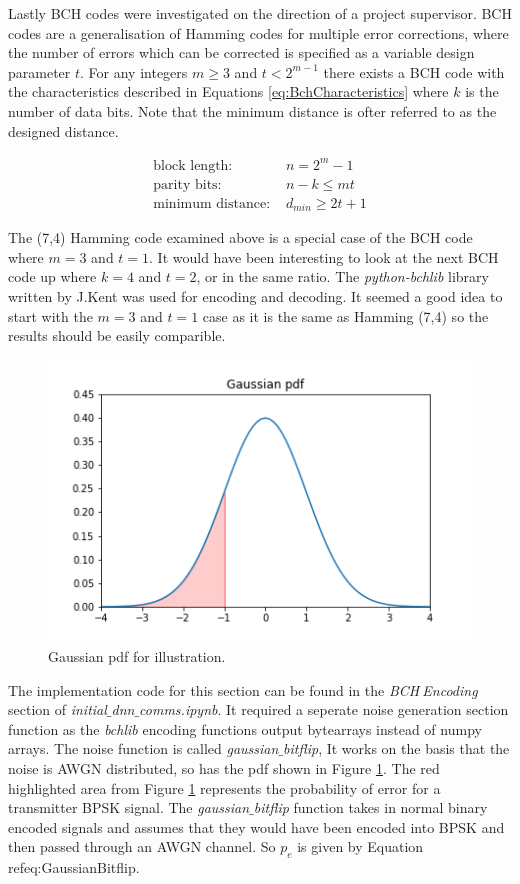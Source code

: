 \documentclass[12pt,onecolumn,letterpaper]{article}
\newcommand{\code}{\textit}
\newcommand\genfigsize{0.5}
\begin{document}
Lastly BCH codes were investigated on the direction of a project supervisor. BCH codes are a generalisation of Hamming codes for multiple error corrections, where the number of errors which can be corrected is specified as a variable design parameter $t$. For any integers $m \geq 3$ and $t < 2^{m-1}$ there exists a BCH code with the characteristics described in Equations \ref{eq:BchCharacteristics} where $k$ is the number of data bits. Note that the minimum distance is ofter referred to as the designed distance.

\begin{align}
   \mbox{block length: }& n = 2^{m}-1 \nonumber\\
   \mbox{parity bits: }& n-k\leq mt \nonumber\\
   \mbox{minimum distance: }& d_{min} \geq 2t+1
   \label{eq:BchCharacteristics}
\end{align}

The (7,4) Hamming code examined above is a special case of the BCH code where $m=3$ and $t=1$. It would have been interesting to look at the next BCH code up where $k=4$ and $t=2$, or in the same ratio. The \code{python-bchlib} library~\cite{BchGithub} written by J.Kent was used for encoding and decoding. It seemed a good idea to start with the $m=3$ and $t=1$ case as it is the same as Hamming (7,4) so the results should be easily comparible.

\begin{figure}
   \centering
   \includegraphics[width=\genfigsize\linewidth]{figures/gaussian_pdf.png}
   \caption{Gaussian pdf for illustration.}
   \label{fig:GaussianPdf}
\end{figure}

The implementation code for this section can be found in the \textit{BCH$\ $Encoding} section of \code{initial$\_$dnn$\_$comms.ipynb}. It required a seperate noise generation section function as the \code{bchlib} encoding functions output bytearrays instead of numpy arrays.  The noise function is called \code{gaussian$\_$bitflip}, It works on the basis that the noise is AWGN distributed, so has the pdf shown in Figure \ref{fig:GaussianPdf}. The red highlighted area from Figure \ref{fig:GaussianPdf} represents the probability of error for a transmitter BPSK signal. The \code{gaussian$\_$bitflip} function takes in normal binary encoded signals and assumes that they would have been encoded into BPSK and then passed through an AWGN channel. So $p_e$ is given by Equation ref{eq:GaussianBitflip}.
\end{document}
